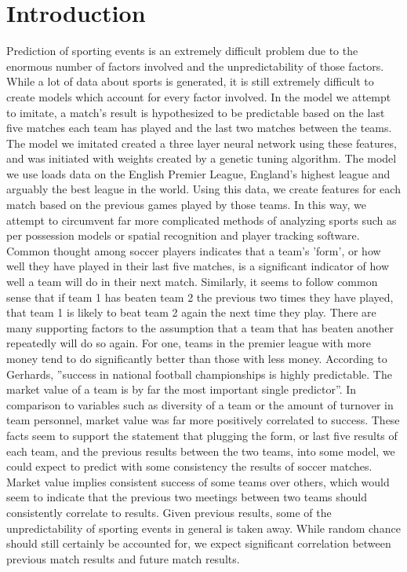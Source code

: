 \documentclass[sigconf]{acmart}
\begin{document}
\section{Introduction}
Prediction of sporting events is an extremely difficult problem due to the enormous number of factors involved and the unpredictability of those factors. While a lot of data about sports is generated, it is still extremely difficult to create models which account for every factor involved. In the model we attempt to imitate, a match's result is hypothesized to be predictable based on the last five matches each team has played and the last two matches between the teams. The model we imitated created a three layer neural network using these features, and was initiated with weights created by a genetic tuning algorithm. The model we use loads data on the English Premier League, England's highest league and arguably the best league in the world. Using this data, we create features for each match based on the previous games played by those teams. In this way, we attempt to circumvent far more complicated methods of analyzing sports such as per possession models or spatial recognition and player tracking software. Common thought among soccer players indicates that a team's 'form', or how well they have played in their last five matches, is a significant indicator of how well a team will do in their next match. Similarly, it seems to follow common sense that if team 1 has beaten team 2 the previous two times they have played, that team 1 is likely to beat team 2 again the next time they play. 
There are many supporting factors to the assumption that a team that has beaten another repeatedly will do so again. For one, teams in the premier league with more money tend to do significantly better than those with less money. According to Gerhards, ''success in national football championships is highly predictable. The market value of a team is by far the most important single predictor''. \cite{MarketValue} In comparison to variables such as diversity of a team or the amount of turnover in team personnel, market value was far more positively correlated to success.
These facts seem to support the statement that plugging the form, or last five results of each team, and the previous results between the two teams, into some model, we could expect to predict with some consistency the results of soccer matches. Market value implies consistent success of some teams over others, which would seem to indicate that the previous two meetings between two teams should consistently correlate to results. Given previous results, some of the unpredictability of sporting events in general is taken away. While random chance should still certainly be accounted for, we expect significant correlation between previous match results and future match results.
\end{document}
